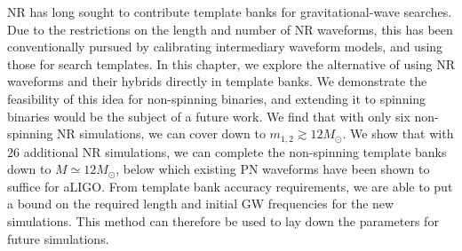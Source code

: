 NR has long sought to contribute template banks for gravitational-wave
searches. Due to the restrictions on the length and number of NR waveforms,
this has been conventionally pursued by calibrating intermediary
waveform models, and
using those for search templates. In this chapter, we explore the alternative
of using NR waveforms and their hybrids directly in template banks.
We demonstrate the feasibility of this idea for non-spinning binaries,
and extending it to spinning binaries would be the subject of a future
work. We find that with only six non-spinning NR simulations, we can 
cover down to $m_{1,2}\gtrsim 12M_\odot$. We show that with
$26$ additional NR simulations, we can complete the non-spinning template
banks down to $M\simeq 12M_\odot$, below which existing PN waveforms 
have been shown to suffice for aLIGO. From template bank accuracy 
requirements, we are able to put a bound on the required length and 
initial GW frequencies for the new simulations. This method can therefore
be used to lay down the parameters for future simulations. 


